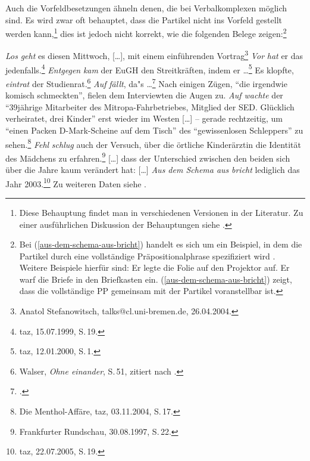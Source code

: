 Auch die Vorfeldbesetzungen ähneln denen, die bei Verbalkomplexen
möglich sind. Es wird zwar oft behauptet, dass die Partikel nicht ins Vorfeld gestellt werden kann,\footnote{
  Diese Behauptung findet man in verschiedenen Versionen in der Literatur. Zu einer
  ausführlichen Diskussion der Behauptungen siehe .%
} dies ist jedoch nicht korrekt, wie die folgenden Belege zeigen:\footnote{
Bei (\ref{aus-dem-schema-aus-bricht}) handelt es sich um ein Beispiel, in dem
die Partikel durch eine vollständige Präpositionalphrase spezifiziert wird \citep{Olsen97a,Olsen99a}.
Weitere Beispiele hierfür sind:
\eal
\ex Er legte die Folie auf den Projektor auf.
\ex Er warf die Briefe in den Briefkasten ein.
\zl 
(\ref{aus-dem-schema-aus-bricht}) zeigt, dass die vollständige PP gemeinsam mit der Partikel voranstellbar ist.%
}

\eal
\label{bsp-partikel-fronting}
\ex \emph{Los} \emph{geht} es diesen Mittwoch, [\ldots], mit einem einführenden Vortrag\footnote{
  Anatol Stefanowitsch, talks@cl.uni-bremen.de, 26.04.2004.
}
\ex
\label{bsp-vor-hat-er-das}
\emph{Vor} \emph{hat} er das jedenfalls.\footnote{
taz, 15.07.1999, S.\,19.
}
\ex \emph{Entgegen} \emph{kam} der EuGH den Streitkräften, indem er \ldots{}\footnote{
taz, 12.01.2000, S.\,1.}
\ex Es klopfte, \emph{eintrat} der Studienrat.\footnote{
Walser, \emph{Ohne einander}, S.\,51, zitiert nach .
}
\ex\label{bsp-auf-faellt}
\emph{Auf}  \emph{fällt}, da"s \ldots{}\footnote{
  .
}
\ex\label{bsp-auf-wachte}
Nach einigen Zügen, "`die irgendwie komisch schmeckten"', fielen dem Interviewten die Augen zu. 
\emph{Auf wachte} der "`39jährige Mitarbeiter des Mitropa-Fahrbetriebes, Mitglied der SED. Glücklich verheiratet, drei Kinder"'
erst %
wieder im Westen [\ldots] -- gerade rechtzeitig, um "`einen Packen D-Mark-Scheine auf dem Tisch"' 
des "`gewissenlosen Schleppers"' zu sehen.\footnote{
  Die Menthol-Affäre, taz, 03.11.2004, S.\,17.
}
\ex \emph{Fehl} \emph{schlug} auch der Versuch, über die örtliche Kinderärztin die Identität des Mädchens zu erfahren.\footnote{
  Frankfurter Rundschau, 30.08.1997, S.\,22.
}
\ex\label{aus-dem-schema-aus-bricht}
{}[\ldots] dass der Unterschied zwischen den beiden sich über die Jahre kaum verändert hat: [\ldots]
    \emph{Aus dem Schema aus} \emph{bricht} lediglich das Jahr 2003.\footnote{
    taz, 22.07.2005, S.\,19.
}
\zl
Zu weiteren Daten siehe .



